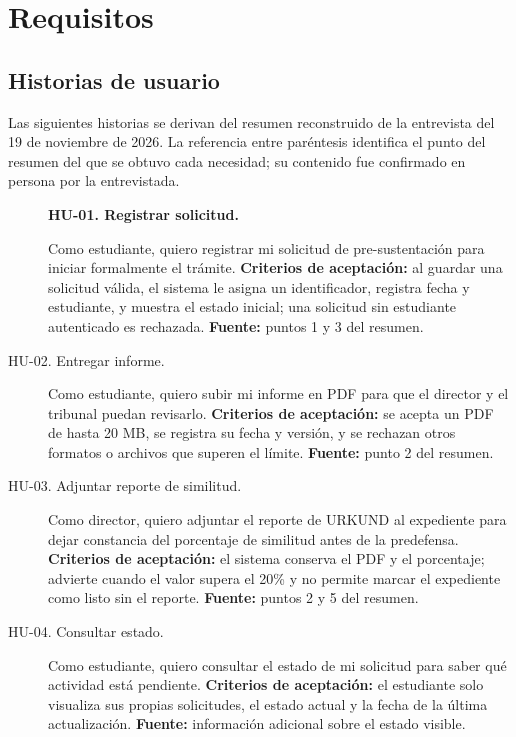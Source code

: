 \section{Requisitos}

\subsection{Historias de usuario}

Las siguientes historias se derivan del resumen reconstruido de la entrevista
del 19 de noviembre de 2026. La referencia entre paréntesis identifica el punto
del resumen del que se obtuvo cada necesidad; su contenido fue confirmado en
persona por la entrevistada.

\begin{description}
    \item[] \textbf{HU-01. Registrar solicitud.}\par
    Como estudiante, quiero registrar mi
    solicitud de pre-sustentación para iniciar formalmente el trámite.
    \textbf{Criterios de aceptación:} al guardar una solicitud válida, el
    sistema le asigna un identificador, registra fecha y estudiante, y muestra
    el estado inicial; una solicitud sin estudiante autenticado es rechazada.
    \textbf{Fuente:} puntos 1 y 3 del resumen.

    \item[HU-02. Entregar informe.] Como estudiante, quiero subir mi informe en
    PDF para que el director y el tribunal puedan revisarlo.
    \textbf{Criterios de aceptación:} se acepta un PDF de hasta 20 MB, se
    registra su fecha y versión, y se rechazan otros formatos o archivos que
    superen el límite. \textbf{Fuente:} punto 2 del resumen.

    \item[HU-03. Adjuntar reporte de similitud.] Como director, quiero adjuntar
    el reporte de URKUND al expediente para dejar constancia del porcentaje de
    similitud antes de la predefensa. \textbf{Criterios de aceptación:} el
    sistema conserva el PDF y el porcentaje; advierte cuando el valor supera
    el 20\% y no permite marcar el expediente como listo sin el reporte.
    \textbf{Fuente:} puntos 2 y 5 del resumen.

    \item[HU-04. Consultar estado.] Como estudiante, quiero consultar el estado
    de mi solicitud para saber qué actividad está pendiente.
    \textbf{Criterios de aceptación:} el estudiante solo visualiza sus propias
    solicitudes, el estado actual y la fecha de la última actualización.
    \textbf{Fuente:} información adicional sobre el estado visible.


\end{description}
